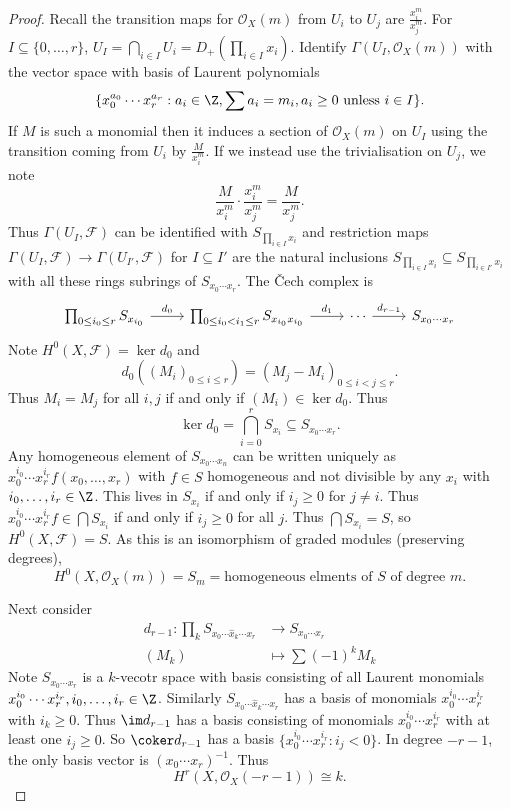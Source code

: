 \documentclass[a4paper]{article}
\newcommand{\sh}[1]{\mathcal{#1}} %
\begin{document}
\begin{proof}
  Recall the transition maps for \(\sh O_X(m)\) from \(U_i\) to \(U_j\) are \(\frac{x_i^m}{x_j^m}\). For \(I \subseteq \{0, \dots, r\}\), \(U_I = \bigcap_{i \in I} U_i = D_+(\prod_{i \in I}x_i)\). Identify \(\Gamma(U_I, \sh O_X(m))\) with the vector space with basis of Laurent polynomials
  \[
    \{x_0^{a_0} \cdots x_r^{a_r}: a_i \in \Z, \sum a_i = m_i, a_i \geq 0 \text{ unless } i \in I\}.
  \]
  If \(M\) is such a monomial then it induces a section of \(\sh O_X(m)\) on \(U_I\) using the transition coming from \(U_i\) by \(\frac{M}{x_i^m}\). If we instead use the trivialisation on \(U_j\), we note
  \[
    \frac{M}{x_i^m} \cdot \frac{x_i^m}{x_j^m} = \frac{M}{x_j^m}.
  \]
  Thus \(\Gamma(U_I, \sh F)\) can be identified with \(S_{\prod_{i \in I}x_i}\) and restriction maps \(\Gamma(U_I, \sh F) \to \Gamma(U_{I'}, \sh F)\) for \(I \subseteq I'\) are the natural inclusions \(S_{\prod_{i \in I} x_i} \subseteq S_{\prod_{i \in I'} x_i}\) with all these rings subrings of \(S_{x_0 \cdots x_r}\). The Čech complex is
  \[
    \begin{tikzcd}
      \prod_{0 \leq i_0 \leq r} S_{x_{i_0}} \ar[r, "d_0"] & \prod_{0 \leq i_0 < i_1 \leq r} S_{x_{i_0} x_{i_0}} \ar[r, "d_1"] & \cdots \ar[r, "d_{r - 1}"] & S_{x_0 \cdots x_r}
    \end{tikzcd}
  \]
  Note \(H^0(X, \sh F) = \ker d_0\) and
  \[
    d_0((M_i)_{0 \leq i \leq r}) = (M_j - M_i)_{0 \leq i < j \leq r}.
  \]
  Thus \(M_i = M_j\) for all \(i, j\) if and only if \((M_i) \in \ker d_0\). Thus
  \[
    \ker d_0 = \bigcap_{i = 0}^r S_{x_i} \subseteq S_{x_0 \cdots x_r}.
  \]
  Any homogeneous element of \(S_{x_0 \cdots x_n}\) can be written uniquely as \(x_0^{i_0} \cdots x_r^{i_r} f(x_0, \dots, x_r)\) with \(f \in S\) homogeneous and not divisible by any \(x_i\) with \(i_0, \dots, i_r \in \Z\). This lives in \(S_{x_i}\) if and only if \(i_j \geq 0\) for \(j \neq i\). Thus \(x_0^{i_0} \cdots x_r^{i_r} f \in \bigcap S_{x_i}\) if and only if \(i_j \geq 0\) for all \(j\). Thus \(\bigcap S_{x_i} = S\), so \(H^0(X, \sh F) = S\). As this is an isomorphism of graded modules (preserving degrees),
  \[
    H^0(X, \sh O_X(m)) = S_m = \text{homogeneous elments of \(S\) of degree \(m\)}.
  \]

  Next consider
  \begin{align*}
    d_{r - 1}: \prod_k S_{x_0 \cdots \hat x_k \cdots x_r} &\to S_{x_0 \cdots x_r} \\
    (M_k) &\mapsto \sum (-1)^k M_k
  \end{align*}
  Note \(S_{x_0 \cdots x_r}\) is a \(k\)-vecotr space with basis consisting of all Laurent monomials \(x_0^{i_0} \cdots x_r^{i_r}, i_0, \dots, i_r \in \Z\). Similarly \(S_{x_0 \cdots \hat x_k \cdots x_r}\) has a basis of monomials \(x_0^{i_0} \cdots x_r^{i_r}\) with \(i_k \geq 0\). Thus \(\im d_{r - 1}\) has a basis consisting of monomials \(x_0^{i_0} \cdots x_r^{i_r}\) with at least one \(i_j \geq 0\). So \(\coker d_{r - 1}\) has a basis \(\{x_0^{i_0} \cdots x_r^{i_r}: i_j < 0\}\). In degree \(-r - 1\), the only basis vector is \((x_0 \cdots x_r)^{-1}\). Thus
  \[
    H^r(X, \sh O_X(-r - 1)) \cong k.
  \]


\end{proof}
\end{document}
